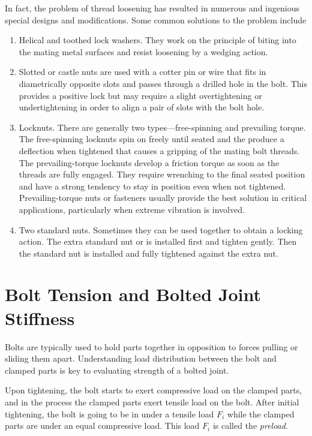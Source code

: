 \documentclass[
10pt,
a4paper,
openany,
svgnames,
]{book}
\begin{document}
In fact, the problem of thread loosening has resulted in numerous and ingenious special designs and modifications. Some common solutions to the problem include

\begin{enumerate}
\item Helical and toothed lock washers. They work on the principle of biting into the mating metal surfaces and resist loosening by a wedging action.
\item Slotted or castle nuts are used with a cotter pin or wire that fits in diametrically opposite slots and passes through a drilled hole in the bolt. This provides a positive lock but may require a slight overtightening or undertightening in order to align a pair of slots with the bolt hole.
\item Locknuts. There are generally two types—free-spinning and prevailing torque. The free-spinning locknuts spin on freely until seated and the produce a deflection when tightened that causes a gripping of the mating bolt threads. The prevailing-torque locknuts develop a friction torque as soon as the threads are fully engaged. They require wrenching to the final seated position and have a strong tendency to stay in position even when not tightened. Prevailing-torque nuts or fasteners usually provide the best solution in critical applications, particularly when extreme vibration is involved.
\item Two standard nuts. Sometimes they can be used together to obtain a locking action. The extra standard nut or is installed first and tighten gently. Then the standard nut is installed and fully tightened against the extra nut.
\end{enumerate}

\section{Bolt Tension and Bolted Joint Stiffness}

Bolts are typically used to hold parts together in opposition to forces pulling or sliding them apart. Understanding load distribution between the bolt and clamped parts is key to evaluating strength of a bolted joint.

Upon tightening, the bolt starts to exert compressive load on the clamped parts, and in the process the clamped parts exert tensile load on the bolt. After initial tightening, the bolt is going to be in under a tensile load $F_i$ while the clamped parts are under an equal compressive load. This load $F_i$ is called the \emph{preload}.
\end{document}
